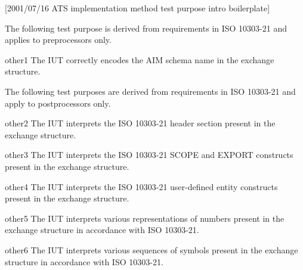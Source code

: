[2001/07/16 ATS implementation method test purpose intro boilerplate]

    The following test purpose is derived from requirements in
ISO 10303-21 and applies to preprocessors only.

other1 The IUT correctly encodes the AIM schema name in the exchange
       structure.

    The following test purposes are derived from requirements in
ISO 10303-21 and apply to postprocessors only.

other2 The IUT interprets the ISO 10303-21 header section
       present in the exchange structure.

other3 The IUT interprets the ISO 10303-21 SCOPE and EXPORT constructs
       present in the exchange structure.

other4 The IUT interprets the ISO 10303-21 user-defined entity constructs
       present in the exchange structure.

other5 The IUT interprets various representations of numbers
       present in the exchange structure
       in accordance with ISO 10303-21.

other6 The IUT interprets various sequences of symbols
       present in the exchange structure
       in accordance with ISO 10303-21.

\par

\endinput
